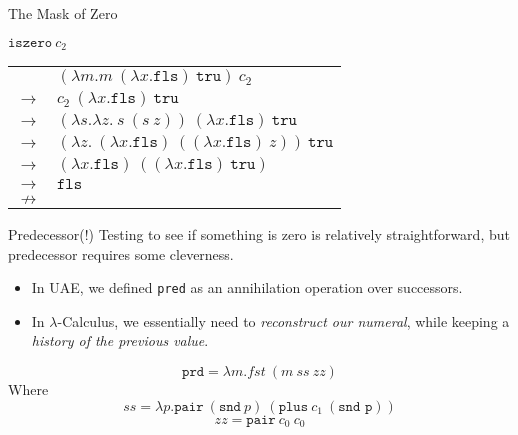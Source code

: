 \documentclass[11pt]{beamer}
\begin{document}
\begin{frame}[fragile=singleslide]{The Mask of Zero}
\begin{center}
\underline{$\texttt{iszero}\:c_2$} \\
\begin{tabular}{c l}
& $(\lambda m. m\:(\lambda x. \texttt{fls})\:\texttt{tru})\:c_2$ \\ 
$\rightarrow$ & $c_2\:(\lambda x. \texttt{fls})\:\texttt{tru}$ \\
$\rightarrow$ & $(\lambda s. \lambda z.\:s\:(s\:z))\:(\lambda x. \texttt{fls})\:\texttt{tru}$ \\
$\rightarrow$ & $(\lambda z.\:(\lambda x. \texttt{fls})\:((\lambda x. \texttt{fls})\:z))\:\texttt{tru}$ \\
$\rightarrow$ & $(\lambda x. \texttt{fls})\:((\lambda x. \texttt{fls})\:\texttt{tru})$ \\
$\rightarrow$ & $\texttt{fls}$ \\
$\nrightarrow$ &  \\
\end{tabular}
\end{center}
\end{frame}

\begin{frame}[fragile=singleslide]{Predecessor(!)}
Testing to see if something is zero is relatively straightforward, but predecessor requires some cleverness.
\begin{itemize}
\item In UAE, we defined \texttt{pred} as an annihilation operation over successors. 
\item In $\lambda$-Calculus, we essentially need to \emph{reconstruct our numeral}, while keeping a \emph{history of the previous value}.  
\end{itemize}
\begin{equation}
\texttt{prd} = \lambda m. fst\:(m\:ss\:zz)
\end{equation}
Where
\begin{equation}
ss = \lambda p. \texttt{pair}\:(\texttt{snd}\:p)\:(\texttt{plus}\:c_1\:(\texttt{snd p}))
\end{equation}
\begin{equation}
zz = \texttt{pair}\:c_0\:c_0 
\end{equation}

\end{frame}
\end{document}
